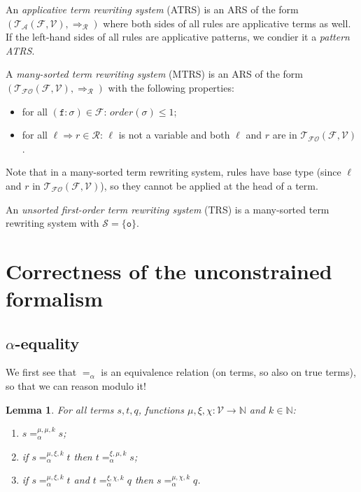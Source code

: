 \documentclass{lmcs}
\theoremstyle{theorem}\newtheorem{theorem}{Theorem}
\theoremstyle{theorem}\newtheorem{lemma}[theorem]{Lemma}
\theoremstyle{theorem}\newtheorem{corollary}[theorem]{Corollary}
\theoremstyle{definition}\newtheorem{definition}[theorem]{Definition}
\theoremstyle{definition}\newtheorem{example}[theorem]{Example}
\newcommand{\N}{\mathbb{N}}
\newcommand{\F}{\mathcal{F}}
\newcommand{\V}{\mathcal{V}}
\newcommand{\Sorts}{\mathcal{S}}
\newcommand{\ATerms}{\mathcal{T}_{\mathcal{A}}}
\newcommand{\FOTerms}{\mathcal{T}_{\mathcal{FO}}}
\newcommand{\Rules}{\mathcal{R}}
\newcommand{\order}{\mathit{order}}
\newcommand{\atype}{\sigma}
\newcommand{\identifier}[1]{\mathtt{#1}}
\newcommand{\afun}{\identifier{f}}
\newcommand{\arrz}{\Rightarrow}
\newcommand{\arr}[1]{\arrz_{#1}}
\newcommand{\unitsort}{\mathtt{o}}
\begin{document}
An \emph{applicative term rewriting system} (ATRS) is an ARS of the form $(\ATerms(\F,\V),
\arr{\Rules})$ where both sides of all rules are applicative terms as well.  If the left-hand sides
of all rules are applicative patterns, we condier it a \emph{pattern ATRS}.

A \emph{many-sorted term rewriting system} (MTRS) is an ARS of the form $(\FOTerms(\F,\V),
\arr{\Rules})$ with the following properties:
\begin{itemize}
\item for all $(\afun : \atype) \in \F$: $\order(\atype) \leq 1$;
\item for all $\ell \arrz r \in \Rules$: $\ell$ is not a variable and both $\ell$ and $r$ are in
  $\FOTerms(\F,\V)$.
\end{itemize}
Note that in a many-sorted term rewriting system, rules have base type (since $\ell$ and $r$ in
$\FOTerms(\F,\V)$), so they cannot be applied at the head of a term.

An \emph{unsorted first-order term rewriting system} (TRS) is a many-sorted term rewriting system
with $\Sorts = \{ \unitsort \}$.

\newpage\appendix

\newcommand{\hideproof}[1]{[Details hidden]}
\newcommand{\showproof}[1]{\ \\\textbf{(details:)}\\#1}

\section{Correctness of the unconstrained formalism}

\subsection{$\alpha$-equality}

We first see that $=_\alpha$ is an equivalence relation (on terms, so also on true terms), so that
we can reason modulo it!

\begin{lemma}\label{lem:alphaequiv}
For all terms $s,t,q$, functions $\mu,\xi,\chi : \V \to \N$ and $k \in \N$:
\begin{enumerate}
\item\label{lem:alphaequiv:reflexive}
  $s =_\alpha^{\mu,\mu,k} s$;
\item\label{lem:alphaequiv:symmetric}
  if $s =_\alpha^{\mu,\xi,k} t$ then $t =_\alpha^{\xi,\mu,k} s$;
\item\label{lem:alphaequiv:transitive}
  if $s =_\alpha^{\mu,\xi,k} t$ and $t =_\alpha^{\xi,\chi,k} q$ then $s =_\alpha^{\mu,\chi,k} q$.
\end{enumerate}
\end{lemma}
\end{document}
